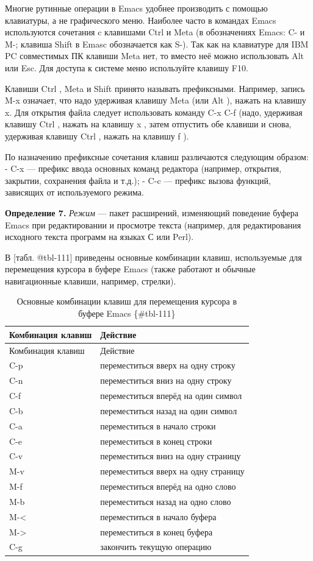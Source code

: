\documentclass[
  english,
  russian,
  12pt,
  a4paper,
]{scrreprt}
\begin{document}
Многие рутинные операции в Emacs удобнее производить с помощью
клавиатуры, а не графического меню. Наиболее часто в командах Emacs
используются сочетания c клавишами Ctrl и Meta (в обозначениях Emacs: C-
и M-; клавиша Shift в Emasc обозначается как S-). Так как на клавиатуре
для IBM PC совместимых ПК клавиши Meta нет, то вместо неё можно
использовать Alt или Esc. Для доступа к системе меню используйте клавишу
F10.

Клавиши Ctrl , Meta и Shift принято называть префиксными. Например,
запись M-x означает, что надо удерживая клавишу Meta (или Alt ), нажать
на клавишу x. Для открытия файла следует использовать команду C-x C-f
(надо, удерживая клавишу Ctrl , нажать на клавишу x , затем отпустить
обе клавиши и снова, удерживая клавишу Ctrl , нажать на клавишу f ).

По назначению префиксные сочетания клавиш различаются следующим образом:
- C-x --- префикс ввода основных команд редактора (например, открытия,
закрытии, сохранения файла и т.д.); - C-c --- префикс вызова функций,
зависящих от используемого режима.

\textbf{Определение 7.} \emph{Режим} --- пакет расширений, изменяющий
поведение буфера Emacs при редактировании и просмотре текста (например,
для редактирования исходного текста программ на языках С или Perl).

В {[}табл. @tbl-111{]} приведены основные комбинации клавиш,
используемые для перемещения курсора в буфере Emacs (также работают и
обычные навигационные клавиши, например, стрелки).

\begin{longtable}[]{@{}ll@{}}
\caption{Основные комбинации клавиш для перемещения курсора в буфере
Emacs \{\#tbl-111\}}\tabularnewline
\toprule\noalign{}
Комбинация клавиш & Действие \\
\midrule\noalign{}
\endfirsthead
\toprule\noalign{}
Комбинация клавиш & Действие \\
\midrule\noalign{}
\endhead
\bottomrule\noalign{}
\endlastfoot
C-p & переместиться вверх на одну строку \\
C-n & переместиться вниз на одну строку \\
C-f & переместиться вперёд на один символ \\
C-b & переместиться назад на один символ \\
C-a & переместиться в начало строки \\
C-e & переместиться в конец строки \\
C-v & переместиться вниз на одну страницу \\
M-v & переместиться вверх на одну страницу \\
M-f & переместиться вперёд на одно слово \\
M-b & переместиться назад на одно слово \\
M-\textless{} & переместиться в начало буфера \\
M-\textgreater{} & переместиться в конец буфера \\
C-g & закончить текущую операцию \\
\end{longtable}
\end{document}
